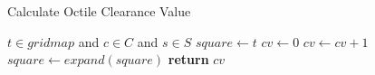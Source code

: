 \begin{algorithm}
\caption{Calculate Octile Clearance Value}
\label{aha-alg:calculateclearance}
\begin{algorithmic}
\REQUIRE $t \in gridmap$ and $c \in C$ and $s \in S$
	\STATE $square \leftarrow t$
	\STATE $cv \leftarrow 0$
		\STATE $cv \leftarrow cv + 1$
		\STATE $square \leftarrow expand(square)$
	\ENDWHILE
	\STATE \textbf{return} $cv$
\end{algorithmic}
\end{algorithm}
